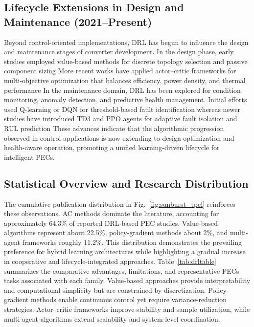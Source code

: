 \subsection{Lifecycle Extensions in Design and Maintenance (2021--Present)}

Beyond control-oriented implementations, DRL has begun to influence the design and maintenance stages of converter development.  
In the design phase, early studies employed value-based methods for discrete topology selection and passive component sizing
More recent works have applied actor--critic frameworks for multi-objective optimization that balances efficiency, power density, and thermal performance
In the maintenance domain, DRL has been explored for condition monitoring, anomaly detection, and predictive health management.  
Initial efforts used Q-learning or DQN for threshold-based fault identification
whereas newer studies have introduced TD3 and PPO agents for adaptive fault isolation and RUL prediction
These advances indicate that the algorithmic progression observed in control applications is now extending to design optimization and health-aware operation, promoting a unified learning-driven lifecycle for intelligent PECs.

\subsection{Statistical Overview and Research Distribution}

The cumulative publication distribution in Fig.~\ref{fig:sunburst_tpel} reinforces these observations. 
AC methods dominate the literature, accounting for approximately 64.3\% of reported DRL-based PEC studies. 
Value-based algorithms represent about 22.5\%, policy-gradient methods about 2\%, and multi-agent frameworks roughly 11.2\%. 
This distribution demonstrates the prevailing preference for hybrid learning architectures while highlighting a gradual increase in cooperative and lifecycle-integrated approaches. 
Table~\ref{tab:drltable} summarizes the comparative advantages, limitations, and representative PECs tasks associated with each family.  
Value-based approaches provide interpretability and computational simplicity but are constrained by discretization.  
Policy-gradient methods enable continuous control yet require variance-reduction strategies.  
Actor--critic frameworks improve stability and sample utilization, while multi-agent algorithms extend scalability and system-level coordination.

